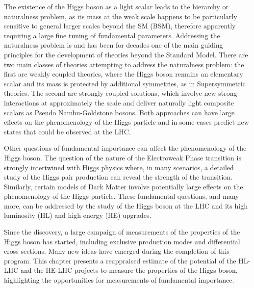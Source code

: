 \documentclass[../report.tex]{subfiles}
\begin{document}
The existence of the Higgs boson as a light scalar leads to the
hierarchy or naturalness problem, as its mass at the weak scale happens to be particularly sensitive to general larger scales beyond the SM (BSM), therefore apparently requiring a large fine tuning of fundamental parameters.
Addressing the naturalness problem is and has been for decades one of
the main guiding principles for the development of theories beyond the
Standard Model. 
There are two main classes of theories attempting
to address the naturalness problem: the first are weakly coupled theories, 
where the Higgs boson
remains an elementary scalar and its mass is protected by additional
symmetries, as in Supersymmetric theories. 
The second are strongly
coupled solutions, which involve new strong interactions at approximately the \UTeV scale and deliver naturally light composite scalars as Pseudo Nambu-Goldstone bosons. Both approaches can have large effects on the phenomenology
of the Higgs particle and in some cases predict new states that could be 
observed at the LHC.

Other questions of fundamental importance can affect the phenomenology
of the Higgs boson.  The question of the nature of the Electroweak Phase transition is strongly intertwined with Higgs physics where, in many scenarios, a detailed study of the Higgs pair production can reveal the strength of the transition.
Similarly, certain models of Dark Matter involve
potentially large effects on the phenomenology of the Higgs
particle.
These fundamental questions, and many more, can be addressed by the study of the
Higgs boson at the LHC and its high luminosity (HL) and high energy
(HE) upgrades.



Since the discovery, a large campaign of measurements of the properties of the
Higgs boson has started, including exclusive production modes and
differential cross sections. Many new ideas have emerged during the
completion of this program. This chapter presents a reappraised
estimate of the potential of the HL-LHC and the HE-LHC projects to
measure the properties of the Higgs boson, highlighting the
opportunities for measurements of fundamental importance.
\end{document}
